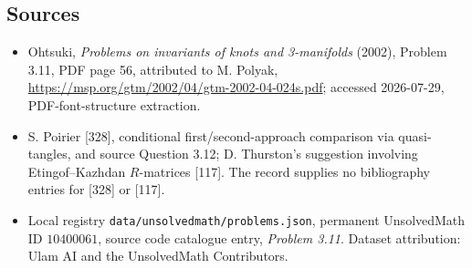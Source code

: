 \documentclass[11pt]{article}
\begin{document}
\subsection{Sources}
\begin{itemize}
\item Ohtsuki, \emph{Problems on invariants of knots and 3-manifolds} (2002), Problem 3.11, PDF page 56, attributed to M. Polyak, \url{https://msp.org/gtm/2002/04/gtm-2002-04-024s.pdf}; accessed 2026-07-29, PDF-font-structure extraction.
\item S. Poirier [328], conditional first/second-approach comparison via quasi-tangles, and source Question 3.12; D. Thurston's suggestion involving Etingof--Kazhdan $R$-matrices [117]. The record supplies no bibliography entries for [328] or [117].
\item Local registry \texttt{data/unsolvedmath/problems.json}, permanent UnsolvedMath ID $10400061$, source code catalogue entry, \emph{Problem 3.11}. Dataset attribution: Ulam AI and the UnsolvedMath Contributors.
\end{itemize}
\end{document}
